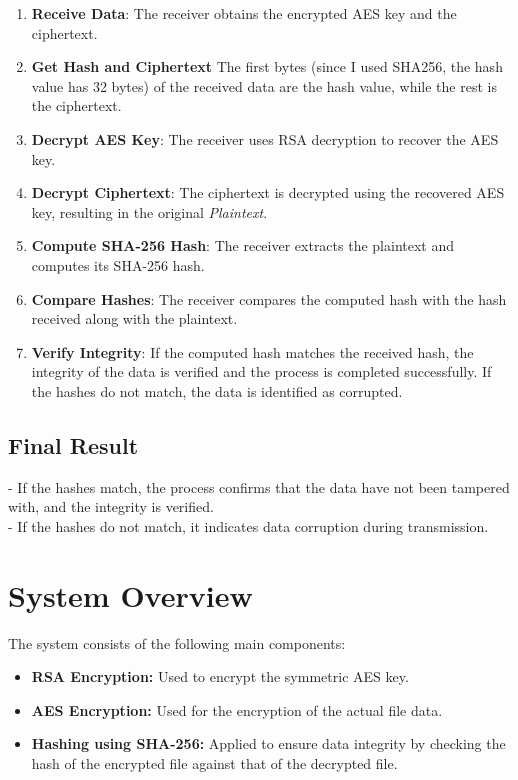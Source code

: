 \documentclass{article}
\begin{document}
\begin{enumerate}
    \item \textbf{Receive Data}:
    The receiver obtains the encrypted AES key and the ciphertext.

    \item \textbf{Get Hash and Ciphertext}
    The first bytes (since I used SHA256, the hash value has 32 bytes) of the received data are the hash value, while the rest is the ciphertext.
    
    \item \textbf{Decrypt AES Key}:
    The receiver uses RSA decryption to recover the AES key.

    \item \textbf{Decrypt Ciphertext}:
    The ciphertext is decrypted using the recovered AES key, resulting in the original \textit{Plaintext}.

    \item \textbf{Compute SHA-256 Hash}:
    The receiver extracts the plaintext and computes its SHA-256 hash.

    \item \textbf{Compare Hashes}:
    The receiver compares the computed hash with the hash received along with the plaintext.

    \item \textbf{Verify Integrity}:
    If the computed hash matches the received hash, the integrity of the data is verified and the process is completed successfully.
    If the hashes do not match, the data is identified as corrupted.
\end{enumerate}

\subsection*{Final Result}

- If the hashes match, the process confirms that the data have not been tampered with, and the integrity is verified. \\
- If the hashes do not match, it indicates data corruption during transmission. \\

\section{System Overview}
The system consists of the following main components:

\begin{itemize}
    \item \textbf{RSA Encryption:} Used to encrypt the symmetric AES key.
    \item \textbf{AES Encryption:} Used for the encryption of the actual file data.
    \item \textbf{Hashing using SHA-256:} Applied to ensure data integrity by checking the hash of the encrypted file against that of the decrypted file. 
\end{itemize}
\end{document}
